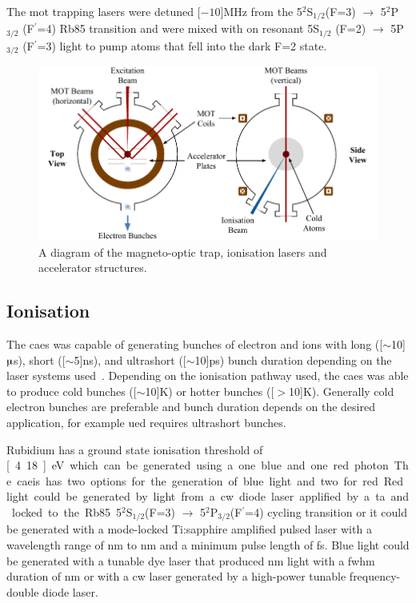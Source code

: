 The \gls{mot} trapping lasers were detuned \unit[$-10$]{MHz} from the 5$^2$S$_{1/2} $(F=3) $\rightarrow$ 5$^2$P$_{3/2}$ (F$^\prime$=4) Rb85 transition and were mixed with on resonant 5S$_{1/2}$ (F=2) $\rightarrow$ 5P$_{3/2}$ (F$^\prime$=3) light to pump atoms that fell into the dark F=2 state.

\begin{figure}
    \center
    \includegraphics[width=145mm]{part2/Figs/MOTdiagram.pdf}
    \caption{A diagram of the magneto-optic trap, ionisation lasers and accelerator structures.}
    \label{figure:mot}
\end{figure}

\subsection{Ionisation}\label{section:two_stage_ionisation}

The \gls{caes} was capable of generating bunches of electron and ions with long (\unit[$\sim$10]{$\muup$s}), short (\unit[$\sim$5]{ns}), and ultrashort (\unit[$\sim$10]{ps}) bunch duration depending on the laser systems used~\cite{speirs_identification_2017,speirs_electron_2017}.
Depending on the ionisation pathway used, the \gls{caes} was able to produce cold bunches (\unit[$\sim$10]{K}) or hotter bunches (\unit[$>$10]{K}).
Generally cold electron bunches are preferable and bunch duration depends on the desired application, for example \gls{ued} requires ultrashort bunches.

Rubidium has a ground state ionisation threshold of \unit[4.18]{eV} which can be generated using a one blue and one red photon.
The \gls{caeis} has two options for the generation of blue light and two for red.
Red light could be generated by light from a \gls{cw} diode laser applified by a \gls{ta} and locked to the Rb85 5$^2$S$_{1/2} $(F=3) $\rightarrow$ 5$^2$P$_{3/2} $(F$^\prime$=4) cycling transition or it could be generated with a mode-locked Ti:sapphire amplified pulsed laser with a wavelength range of \unit[770]{nm} to \unit[830]{nm} and a minimum pulse length of \unit[35]{fs}.
Blue light could be generated with a tunable dye laser that produced \unit[460 to 490]{nm} light with a \gls{fwhm} duration of \unit[5]{nm} or with a \gls{cw} laser generated by a high-power tunable frequency-double diode laser.

